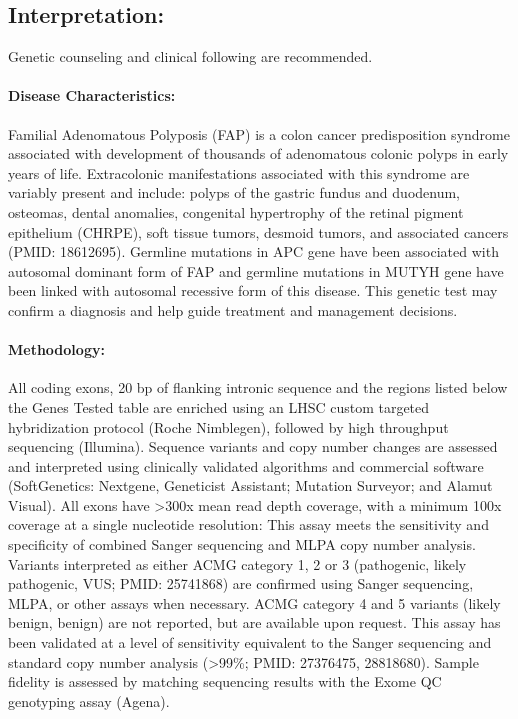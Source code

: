 \documentclass[9pt]{extarticle}
\newcommand{\data}[1]{}
\begin{document}
\subsection*{Interpretation:}
\vspace{-1em}
\data{plugin:long_blurb} 
\newline
Genetic counseling and clinical following are recommended.

\paragraph{Disease Characteristics:} Familial Adenomatous Polyposis (FAP) is a colon cancer predisposition syndrome associated with development of thousands of adenomatous colonic polyps in early years of life. Extracolonic manifestations associated with this syndrome are variably present and include: polyps of the gastric fundus and duodenum, osteomas, dental anomalies, congenital hypertrophy of the retinal pigment epithelium (CHRPE), soft tissue tumors, desmoid tumors, and associated cancers (PMID: 18612695). Germline mutations in APC gene have been associated with autosomal dominant form of FAP and germline mutations in MUTYH gene have been linked with autosomal recessive form of this disease. This genetic test may confirm a diagnosis and help guide treatment and management decisions.

\paragraph{Methodology:} All coding exons, 20 bp of flanking intronic sequence and the regions listed below the Genes Tested table are enriched using an LHSC custom targeted hybridization protocol (Roche Nimblegen), followed by high throughput sequencing (Illumina). Sequence variants and copy number changes are assessed and interpreted using clinically validated algorithms and commercial software (SoftGenetics: Nextgene, Geneticist Assistant; Mutation Surveyor; and Alamut Visual). All exons have >300x mean read depth coverage, with a minimum 100x coverage at a single nucleotide resolution: This assay meets the sensitivity and specificity of combined Sanger sequencing and MLPA copy number analysis. Variants interpreted as either ACMG category 1, 2 or 3 (pathogenic, likely pathogenic, VUS; PMID: 25741868) are confirmed using Sanger sequencing, MLPA, or other assays when necessary. ACMG category 4 and 5 variants (likely benign, benign) are not reported, but are available upon request. This assay has been validated at a level of sensitivity equivalent to the Sanger sequencing and standard copy number analysis (>99\%; PMID: 27376475, 28818680). Sample fidelity is assessed by matching sequencing results with the Exome QC genotyping assay (Agena).
\end{document}
